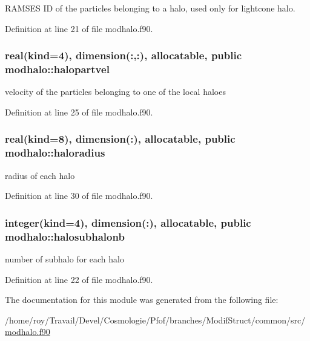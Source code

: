 R\-A\-M\-S\-E\-S I\-D of the particles belonging to a halo, used only for lightcone halo. 



Definition at line 21 of file modhalo.\-f90.

\hypertarget{classmodhalo_abd1eee90e1638db519b34633410ff9d1}{
\subsubsection[{halopartvel}]{\setlength{\rightskip}{0pt plus 5cm}real(kind=4), dimension(\-:,\-:), allocatable, public modhalo\-::halopartvel}}\label{classmodhalo_abd1eee90e1638db519b34633410ff9d1}


velocity of the particles belonging to one of the local haloes 



Definition at line 25 of file modhalo.\-f90.

\hypertarget{classmodhalo_ace49f47effa6d6b9bfbb88aaca6bc0ee}{
\subsubsection[{haloradius}]{\setlength{\rightskip}{0pt plus 5cm}real(kind=8), dimension(\-:), allocatable, public modhalo\-::haloradius}}\label{classmodhalo_ace49f47effa6d6b9bfbb88aaca6bc0ee}


radius of each halo 



Definition at line 30 of file modhalo.\-f90.

\hypertarget{classmodhalo_a5dfc215badbd6aa90e9330266a673923}{
\subsubsection[{halosubhalonb}]{\setlength{\rightskip}{0pt plus 5cm}integer(kind=4), dimension(\-:), allocatable, public modhalo\-::halosubhalonb}}\label{classmodhalo_a5dfc215badbd6aa90e9330266a673923}


number of subhalo for each halo 



Definition at line 22 of file modhalo.\-f90.



The documentation for this module was generated from the following file\-:\begin{DoxyCompactItemize}
\item 
/home/roy/\-Travail/\-Devel/\-Cosmologie/\-Pfof/branches/\-Modif\-Struct/common/src/\hyperlink{modhalo_8f90}{modhalo.\-f90}\end{DoxyCompactItemize}
